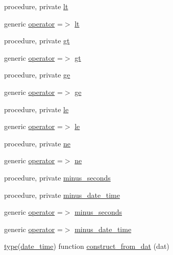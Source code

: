 \begin{DoxyCompactItemize}
\item 
procedure, private \hyperlink{structm__time__oop_1_1date__time_a857db372657e3293e452f862fff6ce1d}{lt}
\item 
generic \hyperlink{structm__time__oop_1_1date__time_a0ec512d8349ac86358a3effcaead9de6}{operator} =$>$ \hyperlink{structm__time__oop_1_1date__time_a857db372657e3293e452f862fff6ce1d}{lt}
\item 
procedure, private \hyperlink{structm__time__oop_1_1date__time_ab3f696e46c40b46d67eafac09e79a190}{gt}
\item 
generic \hyperlink{structm__time__oop_1_1date__time_abcf0f17b4e6ba71f0777dc4e4e47de7f}{operator} =$>$ \hyperlink{structm__time__oop_1_1date__time_ab3f696e46c40b46d67eafac09e79a190}{gt}
\item 
procedure, private \hyperlink{structm__time__oop_1_1date__time_ad98935041c3935fddf79b90b4e81e6d3}{ge}
\item 
generic \hyperlink{structm__time__oop_1_1date__time_a4c84e88433b8d8bde7671ea0c71cea1f}{operator} =$>$ \hyperlink{structm__time__oop_1_1date__time_ad98935041c3935fddf79b90b4e81e6d3}{ge}
\item 
procedure, private \hyperlink{structm__time__oop_1_1date__time_a8cec9fe36f455aa1adb573ff1a74fd14}{le}
\item 
generic \hyperlink{structm__time__oop_1_1date__time_ae2bdcddfab20c4859d6d36ff30b5b778}{operator} =$>$ \hyperlink{structm__time__oop_1_1date__time_a8cec9fe36f455aa1adb573ff1a74fd14}{le}
\item 
procedure, private \hyperlink{structm__time__oop_1_1date__time_aa7a546d067f65edf2ef694ed12eb9533}{ne}
\item 
generic \hyperlink{structm__time__oop_1_1date__time_ab7cce18fa0856dab47620629af1eda32}{operator} =$>$ \hyperlink{structm__time__oop_1_1date__time_aa7a546d067f65edf2ef694ed12eb9533}{ne}
\item 
procedure, private \hyperlink{structm__time__oop_1_1date__time_a249eca2a35ca6e19bc97e023545260ea}{minus\+\_\+seconds}
\item 
procedure, private \hyperlink{structm__time__oop_1_1date__time_a17a93aedcafb0f53d434cd5acda5afbe}{minus\+\_\+date\+\_\+time}
\item 
generic \hyperlink{structm__time__oop_1_1date__time_a1bc7a5d0ab4bd7539e7ec7bafd6dc572}{operator} =$>$ \hyperlink{structm__time__oop_1_1date__time_a249eca2a35ca6e19bc97e023545260ea}{minus\+\_\+seconds}
\item 
generic \hyperlink{structm__time__oop_1_1date__time_a4c3515896bef8d410b6e010b033296c0}{operator} =$>$ \hyperlink{structm__time__oop_1_1date__time_a17a93aedcafb0f53d434cd5acda5afbe}{minus\+\_\+date\+\_\+time}
\item 
\hyperlink{stop__watch_83_8txt_a70f0ead91c32e25323c03265aa302c1c}{type}(\hyperlink{structm__time__oop_1_1date__time}{date\+\_\+time}) function \hyperlink{structm__time__oop_1_1date__time_a7f2959e5ec90cec4912df6ec3df9a5f5}{construct\+\_\+from\+\_\+dat} (dat)
\end{DoxyCompactItemize}
